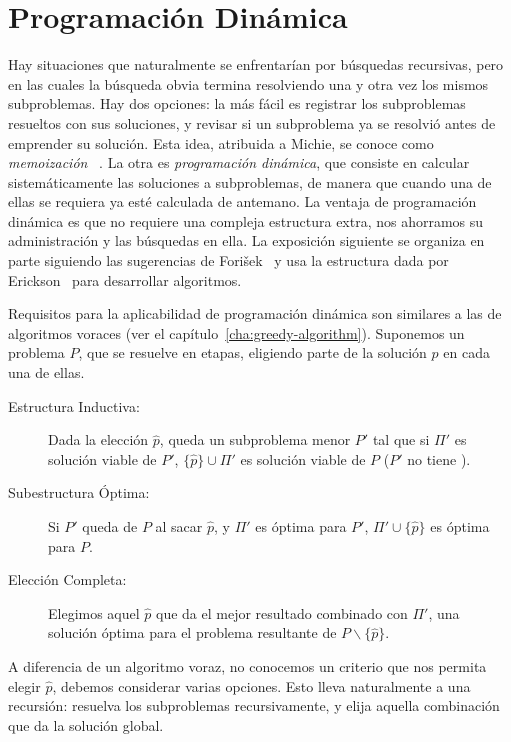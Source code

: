 

\chapter{Programación Dinámica}
\label{cha:programacion-dinamica}

  Hay situaciones que naturalmente se enfrentarían por búsquedas recursivas,
  pero en las cuales la búsqueda obvia termina resolviendo una y otra vez
  los mismos subproblemas.
  Hay dos opciones:
  la más fácil es registrar los subproblemas resueltos con sus soluciones,
  y revisar si un subproblema ya se resolvió antes de emprender su solución.
  Esta idea,
  atribuida a Michie,
  se conoce como \emph{memoización}~%
    \cite{michie68:_memoization}.
  La otra es \emph{programación dinámica},
  que consiste en calcular sistemáticamente las soluciones a subproblemas,
  de manera que cuando una de ellas se requiera ya esté calculada de antemano.
  La ventaja de programación dinámica
  es que no requiere una compleja estructura extra,
  nos ahorramos su administración y las búsquedas en ella.
  La exposición siguiente se organiza en parte
  siguiendo las sugerencias de Forišek~%
    \cite{forisek15:_towards_better_way_teach_dynam_progr}
  y usa la estructura dada por Erickson~%
    \cite{erickson19:_algorithms}
  para desarrollar algoritmos.

  Requisitos para la aplicabilidad de programación dinámica
  son similares a las de algoritmos voraces
  (ver el capítulo~\ref{cha:greedy-algorithm}).
  Suponemos un problema \(P\),
  que se resuelve en etapas,
  eligiendo parte de la solución \(p\) en cada una de ellas.
  \begin{description}
  \item[Estructura Inductiva:]
    Dada la elección \(\widehat{p}\),
    queda un subproblema menor \(P'\)
    tal que si \(\Pi'\) es solución viable de \(P'\),
    \(\{\widehat{p}\} \cup \Pi'\) es solución viable de \(P\)
    (\(P'\) no tiene ).
  \item[Subestructura Óptima:]
    Si \(P'\) queda de \(P\) al sacar \(\hat p\),
    y  \(\Pi'\) es óptima para \(P'\),
    \(\Pi' \cup \{ \widehat{p} \}\) es óptima para \(P\).
  \item[Elección Completa:]
    Elegimos aquel \(\widehat{p}\) que da el mejor resultado
    combinado con \(\Pi'\),
    una solución óptima para el problema resultante
    de \(P \smallsetminus \{ \widehat{p} \}\).
  \end{description}
  A diferencia de un algoritmo voraz,
  no conocemos un criterio 
  que nos permita elegir \(\widehat{p}\),
  debemos considerar varias opciones.
  Esto lleva naturalmente a una recursión:
  resuelva los subproblemas recursivamente,
  y elija aquella combinación que da la solución global.

